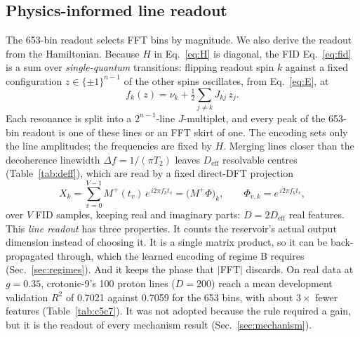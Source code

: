\documentclass[aps,prresearch,preprint,superscriptaddress,amsmath,amssymb,floatfix]{revtex4-2}
\begin{document}
\subsection{Physics-informed line readout}\label{sec:mech-readout}
The 653-bin readout selects FFT bins by magnitude. We also derive the readout from the
Hamiltonian. Because $H$ in Eq.~\eqref{eq:H} is diagonal, the FID
Eq.~\eqref{eq:fid} is a sum over \emph{single-quantum} transitions: flipping readout
spin $k$ against a fixed configuration $z\in\{\pm1\}^{n-1}$ of the other spins
oscillates, from Eq.~\eqref{eq:E}, at
\begin{equation}
  f_k(z) = \nu_k + \tfrac12\!\sum_{j\neq k} J_{kj}\,z_j .
  \label{eq:lines}
\end{equation}
Each resonance is split into a $2^{n-1}$-line $J$-multiplet, and every peak of the
653-bin readout is one of these lines or an FFT skirt of one. The encoding sets only
the line amplitudes; the frequencies are fixed by $H$. Merging lines closer than the
decoherence linewidth $\Delta f=1/(\pi T_2)$ leaves $D_{\mathrm{eff}}$ resolvable
centres (Table~\ref{tab:deff}), which are read by a fixed direct-DFT projection
\begin{equation}
  X_k = \sum_{v=0}^{V-1} M^{+}(t_v)\, e^{\,i 2\pi f_k t_v}
      = \big(M^{+}\Phi\big)_k,\qquad \Phi_{v,k}=e^{\,i2\pi f_k t_v},
  \label{eq:proj}
\end{equation}
over $V$ FID samples, keeping real and imaginary parts: $D=2D_{\mathrm{eff}}$ real
features. This \emph{line readout} has three properties. It counts the reservoir's
actual output dimension instead of choosing it. It is a single matrix product, so it
can be back-propagated through, which the learned encoding of regime B requires
(Sec.~\ref{sec:regimes}). And it keeps the phase that $|$FFT$|$ discards. On real data
at $g=0.35$, crotonic-9's 100 proton lines ($D=200$) reach a mean development
validation $R^2$ of 0.7021 against 0.7059 for the 653 bins, with about $3\times$ fewer
features (Table~\ref{tab:c5c7}). It was not adopted because the rule required a gain,
but it is the readout of every mechanism result (Sec.~\ref{sec:mechanism}).
\end{document}
